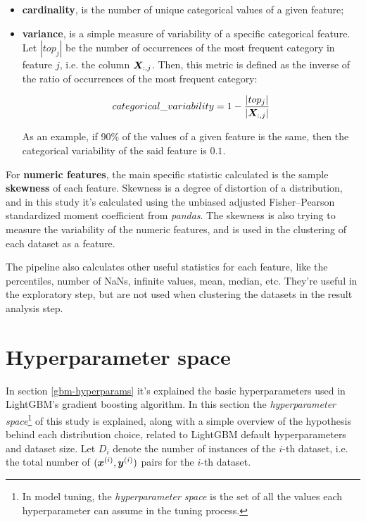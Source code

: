 \begin{itemize}
    \item \textbf{cardinality}, is the number of unique categorical values of a given feature;
    \item \textbf{variance}, is  a simple measure of variability of a specific categorical feature.
    Let $|top_{j}|$ be the number of occurrences of the most frequent category in feature $j$, i.e. the column $\bm{X}_{:, j}$. Then, this metric is defined as the inverse of the ratio of occurrences of the most frequent category:

    $$categorical\_variability=1 - \frac{|top_{j}|}{|\bm{X}_{:, j}|}$$

    As an example, if 90\% of the values of a given feature is the same, then the categorical variability of the said feature is $0.1$.
\end{itemize}

For \textbf{numeric features}, the main specific statistic calculated is the sample \textbf{skewness} of each feature. Skewness is a degree of distortion of a distribution, and in this study it's calculated using the unbiased adjusted Fisher–Pearson standardized moment coefficient from \textit{pandas}. The skewness is also trying to measure the variability of the numeric features, and is used in the clustering of each dataset as a feature.

The pipeline also calculates other useful statistics for each feature, like the percentiles, number of NaNs, infinite values, mean, median, etc. They're useful in the exploratory step, but are not used when clustering the datasets in the result analysis step.

\section{Hyperparameter space}
\label{sec:hyperparam-space}

In section \ref{gbm-hyperparams} it's explained the basic hyperparameters used in LightGBM's gradient boosting algorithm. In this section the \textit{hyperparameter space}\footnote{In model tuning, the \textit{hyperparameter space} is the set of all the values each hyperparameter can assume in the tuning process.} of this study is explained, along with a simple overview of the hypothesis behind each distribution choice, related to LightGBM default hyperparameters and dataset size.  Let $D_i$ denote the number of instances of the $i$-th dataset, i.e. the total number of $(\bm{x}^{(i)},\bm{y}^{(i)})$ pairs for the $i$-th dataset. 

